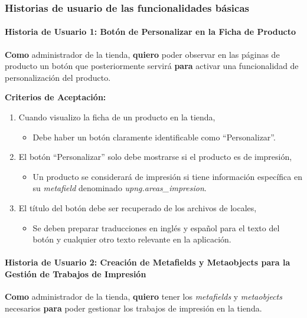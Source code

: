 \documentclass[11pt]{article}
\newcommand{\subsubsubsection}[1]{\paragraph{#1}}
\begin{document}
\subsubsection{Historias de usuario de las funcionalidades básicas}

\subsubsubsection{Historia de Usuario 1: Botón de Personalizar en la Ficha de Producto}\label{sec:historia1}

\textbf{Como} administrador de la tienda, \textbf{quiero} poder observar en las páginas de producto un botón que posteriormente servirá \textbf{para} activar una funcionalidad de personalización del producto.

\vspace{0.5cm}
\textbf{Criterios de Aceptación:}
\begin{enumerate}[label=\arabic*.]
    \item Cuando visualizo la ficha de un producto en la tienda,
          \begin{itemize}[label=--]
              \item Debe haber un botón claramente identificable como ``Personalizar''.    
          \end{itemize}
    \item El botón ``Personalizar'' solo debe mostrarse si el producto es de impresión,
          \begin{itemize}[label=--]
              \item Un producto se considerará de impresión si tiene información específica en su \textit{metafield} denominado \textit{upng.areas\_impresion}.
          \end{itemize}
    \item El título del botón debe ser recuperado de los archivos de locales,
          \begin{itemize}[label=--]
              \item Se deben preparar traducciones en inglés y español para el texto del botón y cualquier otro texto relevante en la aplicación.
          \end{itemize}
\end{enumerate}


\subsubsubsection{Historia de Usuario 2: Creación de Metafields y Metaobjects para la Gestión de Trabajos de Impresión}\label{sec:historia2}

\textbf{Como} administrador de la tienda,
\textbf{quiero} tener los \textit{metafields} y \textit{metaobjects} necesarios \textbf{para} poder gestionar los trabajos de impresión en la tienda.
\end{document}
